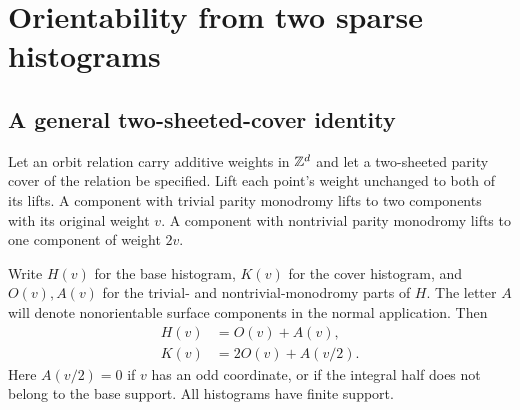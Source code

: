 \section{Orientability from two sparse histograms}
\label{sec:inversion}

\subsection{A general two-sheeted-cover identity}

Let an orbit relation carry additive weights in $\mathbb Z^d$ and let a
two-sheeted parity cover of the relation be specified. Lift each point's
weight unchanged to both of its lifts. A component with trivial parity
monodromy lifts to two components with its original weight $v$. A component
with nontrivial parity monodromy lifts to one component of weight $2v$.

Write $H(v)$ for the base histogram, $K(v)$ for the cover histogram, and
$O(v),A(v)$ for the trivial- and nontrivial-monodromy parts of $H$.
The letter $A$ will denote nonorientable surface components in the normal
application. Then
\begin{align}
 H(v)&=O(v)+A(v),\\
 K(v)&=2O(v)+A(v/2).
 \label{eq:cover}
\end{align}
Here $A(v/2)=0$ if $v$ has an odd coordinate, or if the integral half does
not belong to the base support. All histograms have finite support.

